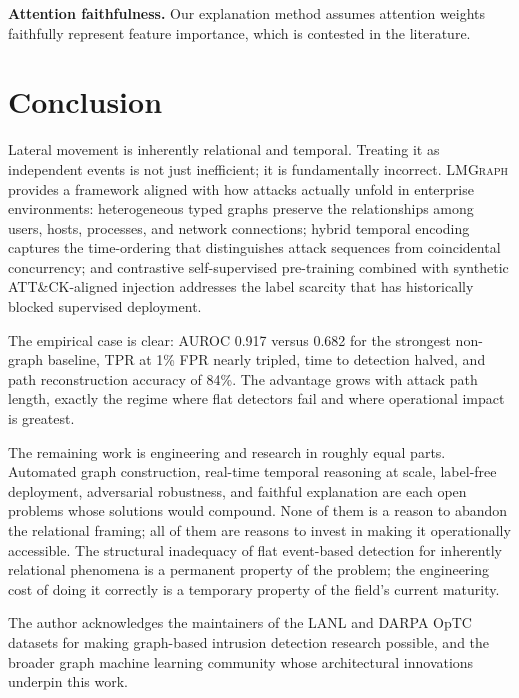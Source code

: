 \documentclass[sigconf,nonacm]{acmart}
\begin{document}
\textbf{Attention faithfulness.} Our explanation method assumes attention
weights faithfully represent feature importance, which is contested in the
literature.

\section{Conclusion}
\label{sec:conclusion}

Lateral movement is inherently relational and temporal. Treating it as
independent events is not just inefficient; it is fundamentally incorrect.
\textsc{LMGraph} provides a framework aligned with how attacks actually
unfold in enterprise environments: heterogeneous typed graphs preserve the
relationships among users, hosts, processes, and network connections;
hybrid temporal encoding captures the time-ordering that distinguishes
attack sequences from coincidental concurrency; and contrastive
self-supervised pre-training combined with synthetic ATT\&CK-aligned injection
addresses the label scarcity that has historically blocked supervised
deployment.

The empirical case is clear: AUROC 0.917 versus 0.682 for the strongest
non-graph baseline, TPR at 1\% FPR nearly tripled, time to detection halved,
and path reconstruction accuracy of 84\%. The advantage grows with attack
path length, exactly the regime where flat detectors fail and where
operational impact is greatest.

The remaining work is engineering and research in roughly equal parts.
Automated graph construction, real-time temporal reasoning at scale,
label-free deployment, adversarial robustness, and faithful explanation are
each open problems whose solutions would compound. None of them is a reason
to abandon the relational framing; all of them are reasons to invest in
making it operationally accessible. The structural inadequacy of flat
event-based detection for inherently relational phenomena is a permanent
property of the problem; the engineering cost of doing it correctly is a
temporary property of the field's current maturity.

\begin{acks}
The author acknowledges the maintainers of the LANL and DARPA OpTC datasets
for making graph-based intrusion detection research possible, and the broader
graph machine learning community whose architectural innovations underpin
this work.
\end{acks}
\end{document}
